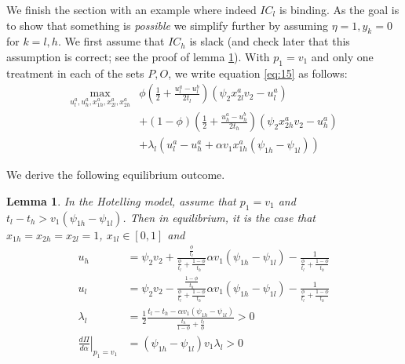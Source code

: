 \documentclass[a4paper,12pt]{article}
\newtheorem{lemma}{Lemma}
\begin{document}
We finish the section with an example where indeed \(IC_l\) is binding. As the goal is to show that something is \emph{possible} we simplify further by assuming \(\eta=1,y_k=0\) for \(k=l,h\). We first assume that \(IC_h\) is slack (and check later that this assumption is correct; see the proof of lemma \ref{Hotelling_equilibrium}). With \(p_1=v_1\) and only one treatment in each of the sets \(P,O\), we write equation \eqref{eq:15} as follows:
\begin{align}
\nonumber
    \max_{u_l^a,u_h^a,x_{1h}^a,x_{2l}^a,x_{2h}^a} & \phi \left(\frac{1}{2} + \frac{u_l^a-u_l^b}{2t_l} \right) (\psi_2 x_{2l}^a v_2 -u_l^a) \\
    \label{eq:20}
     & + (1-\phi) \left(\frac{1}{2} + \frac{u_h^a-u_h^b}{2t_h} \right) (\psi_2 x_{2h}^a v_2 -u_h^a) \\ \nonumber
     & + \lambda_l (u_l^a - u_h^a + \alpha v_1 x_{1h}^a (\psi_{1h}-\psi_{1l}))
\end{align}

We derive the following equilibrium outcome.
\begin{lemma}
\label{Hotelling_equilibrium}
In the Hotelling model, assume that \(p_1 =v_1\) and \(t_l - t_h > v_1 (\psi_{1h}-\psi_{1l})\). Then in equilibrium, it is the case that \(x_{1h}=x_{2h}=x_{2l}=1\), \(x_{1l} \in [0,1]\) and
\begin{align}
\label{eq:21}
u_h &= \psi_2 v_2 + \frac{\frac{\phi}{t_l}}{\frac{\phi}{t_l}+\frac{1-\phi}{t_h}}\alpha v_1 (\psi_{1h}-\psi_{1l})- \frac{1}{\frac{\phi}{t_l}+\frac{1-\phi}{t_h}}  \\
\label{eq:21b}
u_l &= \psi_2 v_2 - \frac{\frac{1-\phi}{t_h}}{\frac{\phi}{t_l}+\frac{1-\phi}{t_h}}\alpha v_1 (\psi_{1h}-\psi_{1l})- \frac{1}{\frac{\phi}{t_l}+\frac{1-\phi}{t_h}}  \\
\label{eq:21c}
\lambda_{l} &= \frac{1}{2} \frac{t_l-t_h-\alpha v_1 (\psi_{1h}-\psi_{1l})}{\frac{t_h}{1-\phi}+\frac{t_l}{\phi}} > 0 \\
\label{eq:21d}
\left. \frac{d\Pi}{d\alpha}\right|_{p_1=v_1} &= (\psi_{1h}-\psi_{1l}) v_1 \lambda_l > 0
\end{align}
\end{lemma}
\end{document}

